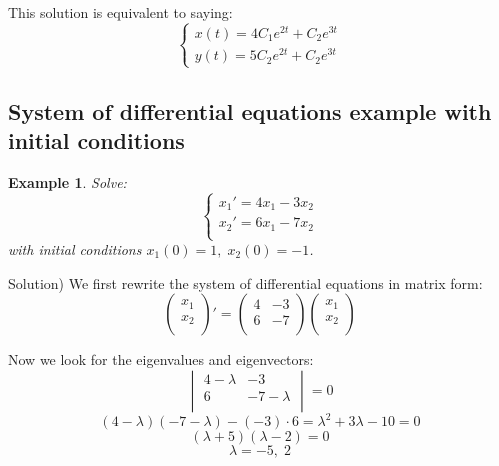 \documentclass[12pt]{report}
\newtheorem{ex}{Example}[section]
\begin{document}
This solution is equivalent to saying:
$$\begin{cases}x(t) = 4C_1 e^{2t}+ C_2 e^{3t} \\ y(t) = 5C_2 e^{2t}+ C_2 e^{3t}  \end{cases}$$

\subsection*{System of differential equations example with initial conditions}

\begin{ex} Solve:
$$\begin{cases} x_1' = 4x_1-3x_2 \\ x_2' =6 x_1 - 7x_2 \\  \end{cases}$$
with initial conditions $x_1(0) = 1, \; x_2(0) = -1$.
\end{ex}
Solution) We first rewrite the system of differential equations in matrix form:
$$\begin{pmatrix} x_1 \\ x_2\\ \end{pmatrix}' = \begin{pmatrix} 4& -3 \\ 6& -7\\ \end{pmatrix} \begin{pmatrix} x_1 \\ x_2\\ \end{pmatrix}  $$

Now we look for the eigenvalues and eigenvectors:
$$\begin{vmatrix} 4-\lambda & -3 \\ 6 & -7-\lambda \\ \end{vmatrix} = 0$$
$$(4-\lambda)(-7-\lambda)-(-3)\cdot 6 = \lambda^2 +3\lambda -10 = 0$$
$$(\lambda +5)(\lambda -2) = 0$$
$$\lambda =-5, \; 2$$
\end{document}
